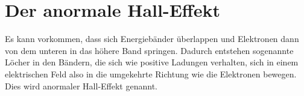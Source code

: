 \section{Der anormale Hall-Effekt}
Es kann vorkommen, dass sich Energiebänder überlappen und Elektronen dann von dem unteren in das höhere Band
springen. Dadurch entstehen sogenannte Löcher in den Bändern, die sich wie positive Ladungen verhalten, sich 
in einem elektrischen Feld also in die umgekehrte Richtung wie die Elektronen bewegen. Dies wird anormaler 
Hall-Effekt genannt.